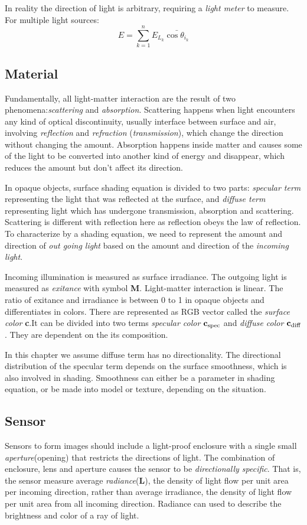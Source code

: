 \documentclass[10pt, a4paper]{article}
\begin{document}
        In reality the direction of light is arbitrary, requiring a \emph{light meter} to measure. For multiple light sources: 
        $$E = \sum_{k = 1}^{n}E_{L_k}\bar{\cos{\theta_{i_k}}}$$
    
    \subsection{Material}
        Fundamentally, all light-matter interaction are the result of two phenomena:\emph{scattering} and \emph{absorption}. Scattering happens when light encounters any kind of optical discontinuity, usually interface between surface and air, involving \emph{reflection} and \emph{refraction} (\emph{transmission}), which change the direction without changing the amount. Absorption happens inside matter and causes some of the light to be converted into another kind of energy and disappear, which reduces the amount but don't affect its direction. 
        
        In opaque objects, surface shading equation is divided to two parts: \emph{specular term} representing the light that was reflected at the surface, and \emph{diffuse term} representing light which has undergone transmission, absorption and scattering. Scattering is different with reflection here as reflection obeys the law of reflection. To characterize by a shading equation, we need to represent the amount and direction of \emph{out going light} based on the amount and direction of the \emph{incoming light}.

        Incoming illumination is measured as surface irradiance. The outgoing light is measured as \emph{exitance} with symbol \textbf{M}. Light-matter interaction is linear. The ratio of exitance and irradiance is between 0 to 1 in opaque objects and differentiates in colors. There are represented as RGB vector called the \emph{surface color} \textbf{c}.It can be divided into two terms \emph{specular color} $\textbf{c}_{\rm{spec}}$ and \emph{diffuse color} $\textbf{c}_{\rm{diff}}$. They are dependent on the its composition.
        
        In this chapter we assume diffuse term has no directionality. The directional distribution of the specular term depends on the surface smoothness, which is also involved in shading. Smoothness can either be a parameter in shading equation, or be made into model or texture, depending on the situation. 

    \subsection{Sensor}
        Sensors to form images should include a light-proof enclosure with a single small \emph{aperture}(opening) that restricts the directions of light. The combination of enclosure, lens and aperture causes the sensor to be \emph{directionally specific}. That is, the sensor measure average \emph{radiance}($\textbf{L}$), the density of light flow per unit area per incoming direction, rather than average irradiance, the density of light flow per unit area from all incoming direction. Radiance can used to describe the brightness and color of a ray of light. 
\end{document}

